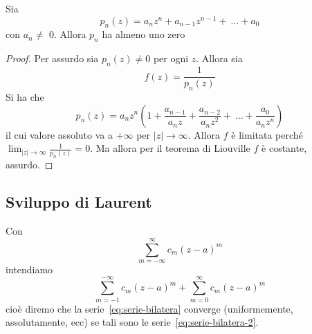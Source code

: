\begin{corollary}
    Sia 
    \[
        p_{n}{(z)} = a_{n} z^{n} + a_{n-1} z^{n-1} +~\dots + a_{0}
    \]
    con \(a_{n} \neq\) 0. Allora \(p_{n}\) ha almeno uno zero
    
\end{corollary}
\begin{proof}
    Per assurdo sia \(p_{n}{(z)} \neq 0\) per ogni \(z\). Allora sia
    \[
        f{(z)} = \frac{1}{p_{n}{(z)}}
    \]
    Si ha che 
    \[
        p_{n}{(z)} = a_{n} z^{n} {\left( 1 + \frac{a_{n-1}}{a_{n} z} +
        \frac{a_{n-2}}{a_{n} z^2} +~\dots+ \frac{a_{0}}{a_{n} z^{n}} \right)}
    \]
    il cui valore assoluto va a \(+\infty\) per \(|z| \to \infty\). Allora \(f\)
    è limitata perché \(\displaystyle \lim_{|z| \to \infty} \frac{1}{p_{n}{(z)}}
    = 0\).
    Ma allora per il teorema di Liouville \(f\) è costante, assurdo.
\end{proof}

\subsection{Sviluppo di \textbf{Laurent}}
Con
\begin{equation}\label{eq:serie-bilatera}
    \sum_{m=-\infty}^{\infty} c_m {(z-a)}^{m}
\end{equation}
intendiamo
\begin{equation}\label{eq:serie-bilatera-2}
    \sum_{m=-1}^{-\infty} c_m {(z-a)}^{m} + \sum_{m=0}^{\infty} c_m {(z-a)}^{m}
\end{equation}
cioè diremo che la serie~\eqref{eq:serie-bilatera} converge (uniformemente,
assolutamente, ecc) se tali sono le serie~\eqref{eq:serie-bilatera-2}.

